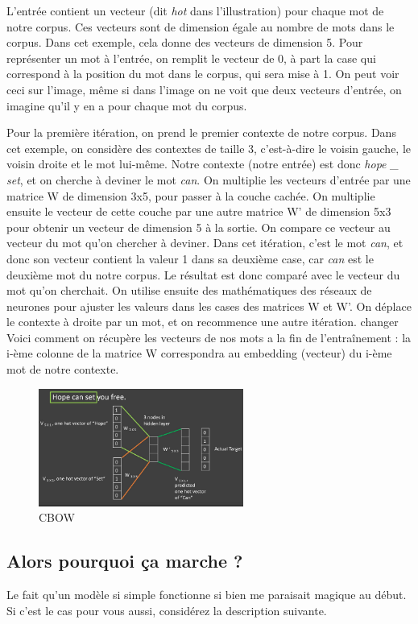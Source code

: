 \documentclass[11pt, a4paper]{report}
\begin{document}
L'entrée 
contient un vecteur (dit \textit{hot} dans l'illustration) pour chaque mot de notre corpus. 
Ces vecteurs sont de dimension égale au nombre de mots dans le corpus. Dans cet exemple, cela 
donne des vecteurs de dimension 5. Pour représenter un mot à l'entrée, on remplit le vecteur 
de 0, à part la case qui correspond à la position du mot dans le corpus, qui sera mise à 1. 
On peut voir ceci sur l'image, même si dans l'image on ne voit que deux vecteurs d'entrée, 
on imagine qu'il y en a pour chaque mot du corpus. 

Pour la première itération, on prend le premier contexte de notre corpus. Dans cet exemple, 
on considère des contextes de taille 3, c'est-à-dire le voisin gauche, le voisin droite et le mot lui-même.
Notre contexte (notre entrée) est donc \textit{hope \_ set}, et on cherche à deviner le mot \textit{can}.
On multiplie les vecteurs d'entrée par une matrice W de dimension 3x5, pour passer à la couche cachée. 
On multiplie ensuite le vecteur de cette couche par une autre matrice W' de dimension 5x3 pour obtenir 
un vecteur de dimension 5 à la sortie. On compare ce vecteur au vecteur du mot qu'on chercher à deviner. 
Dans cet itération, c'est le mot \textit{can}, et donc son vecteur contient la valeur 1 dans sa deuxième 
case, car \textit{can} est le deuxième mot du notre corpus. Le résultat est donc comparé avec le vecteur 
du mot qu'on cherchait. On utilise ensuite des mathématiques des réseaux de neurones pour ajuster les 
valeurs dans les cases des matrices W et W'. On déplace le contexte à droite par un mot, et on recommence 
une autre itération. 
changer
Voici comment on récupère les vecteurs de nos mots a la fin de l'entraînement : la i-ème colonne de la 
matrice W correspondra au embedding (vecteur) du i-ème mot de notre contexte. 

\begin{figure}[h]
  \centering
  \includegraphics[width=0.6\textwidth]{cbow.png}
  \caption{CBOW}
  \label{fig:cbow}
\end{figure}


\subsection{Alors pourquoi ça marche ?}
Le fait qu'un modèle si simple fonctionne si bien me paraisait magique au début. Si c'est le 
cas pour vous aussi, considérez la description suivante. 
\end{document}
